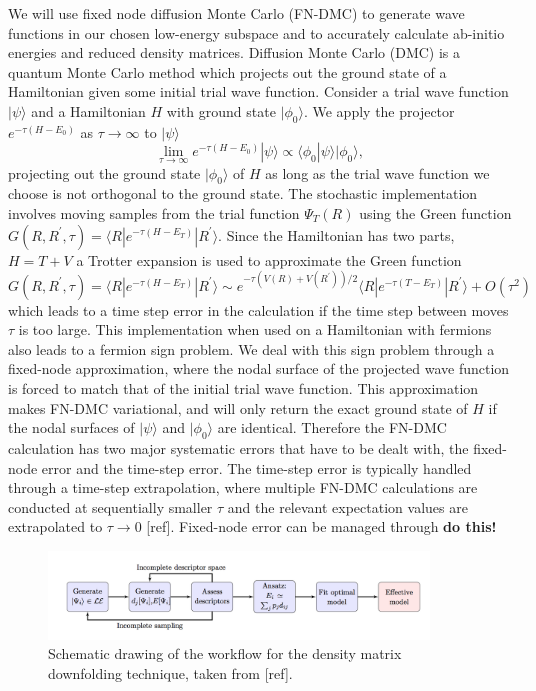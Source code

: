 \documentclass{article}
\begin{document}
We will use fixed node diffusion Monte Carlo (FN-DMC) to generate
wave functions in our chosen low-energy subspace and to accurately calculate ab-initio energies and reduced density matrices. 
Diffusion Monte Carlo (DMC) is a quantum Monte Carlo method which projects out the ground state of a Hamiltonian given some initial trial wave function. 
Consider a trial wave function $|\psi\rangle$ and a Hamiltonian $H$ with ground state $|\phi_0\rangle$. 
We apply the projector $e^{-\tau (H-E_0)}$ as $\tau \rightarrow \infty$ to $|\psi \rangle$
\begin{equation}
\lim_{\tau \rightarrow \infty} e^{-\tau (H-E_0)} |\psi\rangle \propto \langle \phi_0|\psi\rangle |\phi_0\rangle,
\end{equation}
projecting out the ground state $|\phi_0\rangle$ of $H$ as long as the trial wave function we choose is not orthogonal to the ground state. 
The stochastic implementation involves moving samples from the trial function $\Psi_T(R)$ using the Green function $G(R, R^\prime, \tau) = \langle R | e^{-\tau(H - E_T)} | R^\prime \rangle$. 
Since the Hamiltonian has two parts, $H = T + V$ a Trotter expansion is used to approximate the Green function $G(R, R^\prime, \tau) = \langle R | e^{-\tau(H - E_T)} | R^\prime \rangle \sim e^{-\tau(V(R) + V(R^\prime))/2} \langle R| e^{-\tau(T - E_T)}|R^\prime \rangle + O(\tau^2) $ which leads to a time step error in the calculation if the time step between moves $\tau$ is too large. 
This implementation when used on a Hamiltonian with fermions also leads to a fermion sign problem. 
We deal with this sign problem through a fixed-node approximation, where the nodal surface of the projected wave function is forced to match that of the initial trial wave function. 
This approximation makes FN-DMC variational, and will only return the exact ground state of $H$ if the nodal surfaces of $|\psi\rangle$ and $|\phi_0\rangle$ are identical. 
Therefore the FN-DMC calculation has two major systematic errors that have to be dealt with, the fixed-node error and the time-step error. 
The time-step error is typically handled through a time-step extrapolation, where multiple FN-DMC calculations are conducted at sequentially smaller $\tau$ and the relevant expectation values are extrapolated to $\tau \rightarrow 0$ [ref]. 
Fixed-node error can be managed through \textbf{do this!}

\begin{figure}[H]
\centering
\includegraphics[width=0.9\textwidth]{Figures/I2-DMD_flow.png}
\caption{\label{fig1} Schematic drawing of the workflow for the density matrix downfolding technique, taken from [ref].}
\end{figure}
\end{document}
